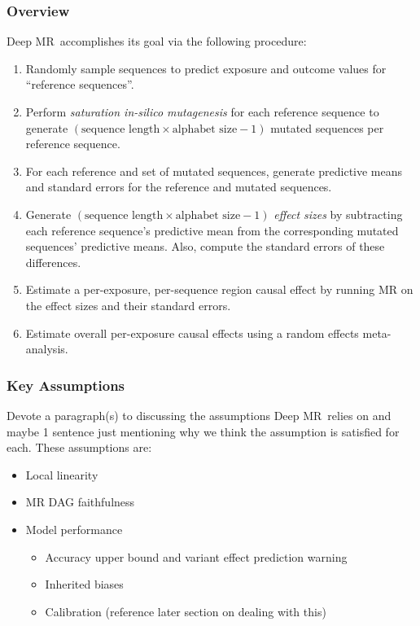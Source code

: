 \documentclass[twoside,11pt]{article}
\newcommand{\method}{{Deep MR}}
\begin{document}
\subsubsection{Overview}%
\method\ accomplishes its goal via the following procedure: 
\label{ssub:algo_overview}
\begin{enumerate}
    \item Randomly sample sequences to predict exposure and outcome values for ``reference sequences''.
    \item Perform \textit{saturation in-silico mutagenesis} for each reference sequence to generate \( (\text{sequence\ length} \times \text{alphabet\ size} - 1) \) mutated sequences per reference sequence.
    \item For each reference and set of mutated sequences, generate predictive means and standard errors for the reference and mutated sequences.
    \item Generate \( (\text{sequence length} \times \text{alphabet size} - 1) \) \textit{effect sizes} by subtracting each reference sequence's predictive mean from the corresponding mutated sequences' predictive means. Also, compute the standard errors of these differences.
    \item Estimate a per-exposure, per-sequence region causal effect by running MR on the effect sizes and their standard errors.
    \item Estimate overall per-exposure causal effects using a random effects meta-analysis.
\end{enumerate}

\subsubsection{Key Assumptions}%
\label{ssub:key_assumptions}
Devote a paragraph(s) to discussing the assumptions \method\ relies on and maybe 1 sentence just mentioning why we think the assumption is satisfied for each. These assumptions are:
\begin{itemize}
	\item Local linearity
	\item MR DAG faithfulness
	\item Model performance
		\begin{itemize}
			\item Accuracy upper bound and variant effect prediction warning
			\item Inherited biases
			\item Calibration (reference later section on dealing with this)
		\end{itemize}
\end{itemize}
\end{document}
